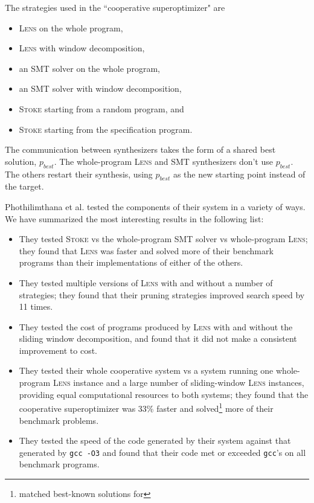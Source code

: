 \documentclass[12pt,twoside]{reedthesis}
\begin{document}
        The strategies used in the ``cooperative superoptimizer" are
        \begin{itemize}
            \item \textsc{Lens} on the whole program,
            \item \textsc{Lens} with window decomposition,
            \item an SMT solver on the whole program,
            \item an SMT solver with window decomposition,
            \item \textsc{Stoke} starting from a random program, and
            \item \textsc{Stoke} starting from the specification program.
        \end{itemize}
        The communication between synthesizers takes the form of a shared best solution, $p_{best}$.
        The whole-program \textsc{Lens} and SMT synthesizers don't use $p_{best}$. The others restart their synthesis, using $p_{best}$ as the new starting point instead of the target.
        
        Phothilimthana et al. tested the components of their system in a variety of ways. We have summarized the most interesting results in the following list:
        \begin{itemize}
            \item They tested \textsc{Stoke} vs the whole-program SMT solver vs whole-program \textsc{Lens}; they found that \textsc{Lens} was faster and solved more of their benchmark programs than their implementations of either of the others.
            \item They tested multiple versions of \textsc{Lens} with and without a number of strategies; they found that their pruning strategies improved search speed by 11 times.
            \item They tested the cost of programs produced by \textsc{Lens} with and without the sliding window decomposition, and found that it did not make a consistent improvement to cost.
            \item They tested their whole cooperative system vs a system running one whole-program \textsc{Lens} instance and a large number of sliding-window \textsc{Lens} instances, providing equal computational resources to both systems; they found that the cooperative superoptimizer was 33\% faster and solved\footnote{matched best-known solutions for} more of their benchmark problems.
            \item They tested the speed of the code generated by their system against that generated by \texttt{gcc -O3} and found that their code met or exceeded \texttt{gcc}'s on all benchmark programs.
        \end{itemize}
        
\end{document}
